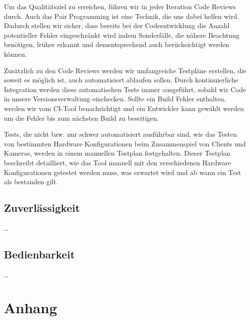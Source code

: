 \documentclass[accentcolor=tud0b,12pt,paper=a4]{tudreport}
\begin{document}
          Um das Qualitätsziel zu erreichen, führen wir in jeder Iteration Code Reviews durch. Auch das Pair Programming ist eine Technik, die uns dabei helfen wird. Dadurch stellen wir sicher, dass bereits bei der Codeentwicklung die Anzahl potentieller Fehler eingeschränkt wird indem Sonderfälle, die nähere Beachtung benötigen, früher erkannt und dementsprechend auch berücksichtigt werden können.

          Zusätzlich zu den Code Reviews werden wir umfangreiche Testpläne erstellen, die soweit es möglich ist, auch automatisiert ablaufen sollen. Durch kontinuierliche Integration werden diese automatischen Tests immer ausgeführt, sobald wir Code in unsere Versionsverwaltung einchecken. Sollte ein Build Fehler enthalten, werden wir vom CI-Tool benachrichtigt und ein Entwickler kann gewählt werden um die Fehler bis zum nächsten Build zu beseitigen.

          Tests, die nicht bzw. nur schwer automatisiert ausführbar sind, wie das Testen von bestimmten Hardware Konfigurationen beim Zusammenspiel von Clients und Kameras, werden in einem manuellen Testplan festgehalten. Dieser Testplan beschreibt detailliert, wie das Tool manuell mit den verschiedenen Hardware Konfigurationen getestet werden muss, was erwartet wird und ab wann ein Test als bestanden gilt.


        \section{Zuverlässigkeit}
	        \ldots
	      \section{Bedienbarkeit}
	        \ldots

	        
	
\appendix	
	\chapter{Anhang}

	
\end{document}
